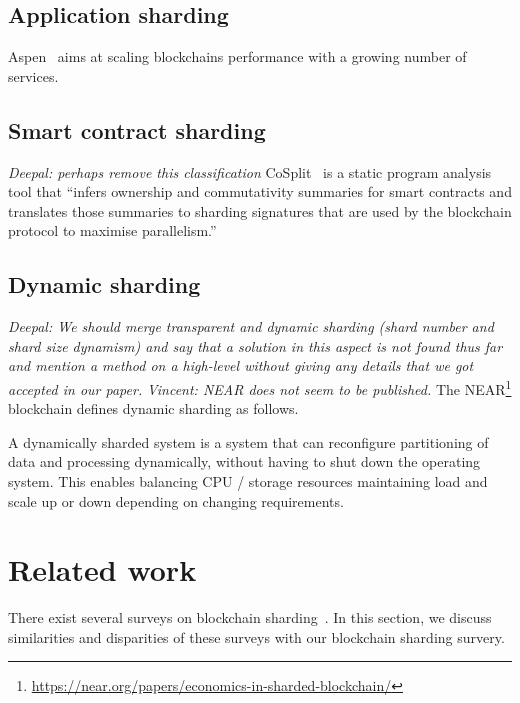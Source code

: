 \documentclass[11pt,dvipdfm]{article}
\newcommand{\vincent}[1]{\emph{Vincent: #1}}%
\newcommand{\deepal}[1]{\emph{Deepal: #1}}%
\begin{document}
{%

\subsection{Application sharding}
Aspen~\cite{GRS17} aims at scaling blockchains performance with a growing number of services.

\subsection{Smart contract sharding}
\deepal{perhaps remove this classification}
CoSplit~\cite{PKS21} is a static program analysis tool that ``infers ownership and commutativity summaries for smart contracts 
and translates those summaries to sharding signatures that are used by the blockchain protocol to maximise parallelism.''

\subsection{Dynamic sharding}
\deepal{We should merge transparent and dynamic sharding (shard number and shard size dynamism) and say that a solution in this aspect is not found thus far and mention a method on a high-level without giving any details that we got accepted in our paper.}
\vincent{NEAR does not seem to be published.}
The {\sc NEAR}\footnote{\url{https://near.org/papers/economics-in-sharded-blockchain/}} blockchain defines dynamic sharding as follows.

\begin{definition} A dynamically sharded system is a system that can reconfigure partitioning of data and processing dynamically, without having to shut down the operating system. This enables balancing CPU / storage resources maintaining load and scale up or down depending on changing requirements.
\end{definition}}


\section{Related work}\label{sec:rw}

There exist several surveys on blockchain sharding~\cite{WSN19,YWY20,XZX21}. In this section, we discuss similarities and disparities of these surveys with our blockchain sharding survery.

\end{document}
